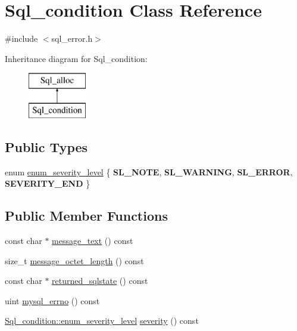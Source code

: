 \hypertarget{classSql__condition}{}\section{Sql\+\_\+condition Class Reference}
\label{classSql__condition}


{\ttfamily \#include $<$sql\+\_\+error.\+h$>$}

Inheritance diagram for Sql\+\_\+condition\+:\begin{figure}[H]
\begin{center}
\leavevmode
\includegraphics[height=2.000000cm]{classSql__condition}
\end{center}
\end{figure}
\subsection*{Public Types}
\begin{DoxyCompactItemize}
\item 
enum \mbox{\hyperlink{classSql__condition_ab0602581e19cddb609bfe10c44be4e83}{enum\+\_\+severity\+\_\+level}} \{ {\bfseries S\+L\+\_\+\+N\+O\+TE}, 
{\bfseries S\+L\+\_\+\+W\+A\+R\+N\+I\+NG}, 
{\bfseries S\+L\+\_\+\+E\+R\+R\+OR}, 
{\bfseries S\+E\+V\+E\+R\+I\+T\+Y\+\_\+\+E\+ND}
 \}
\end{DoxyCompactItemize}
\subsection*{Public Member Functions}
\begin{DoxyCompactItemize}
\item 
const char $\ast$ \mbox{\hyperlink{classSql__condition_a5c53594f4d2c304328386ddcff4a3e8c}{message\+\_\+text}} () const
\item 
size\+\_\+t \mbox{\hyperlink{classSql__condition_a3bcb85e06992f8c792723698b14068aa}{message\+\_\+octet\+\_\+length}} () const
\item 
const char $\ast$ \mbox{\hyperlink{classSql__condition_a10c33b3c6889d6da51c7f10f95d8bf58}{returned\+\_\+sqlstate}} () const
\item 
uint \mbox{\hyperlink{classSql__condition_aa66ad8bfdcabeaa941d3d5089e371525}{mysql\+\_\+errno}} () const
\item 
\mbox{\hyperlink{classSql__condition_ab0602581e19cddb609bfe10c44be4e83}{Sql\+\_\+condition\+::enum\+\_\+severity\+\_\+level}} \mbox{\hyperlink{classSql__condition_ae5f2d0189912eb65a1b043f8b4db88b7}{severity}} () const
\end{DoxyCompactItemize}
